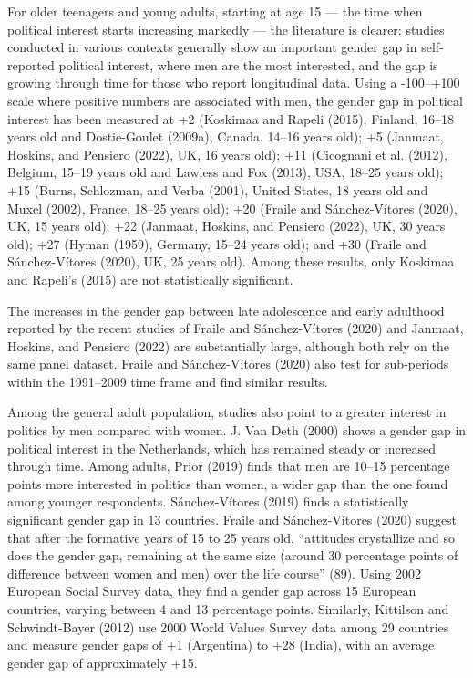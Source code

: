 \documentclass[
  letterpaper,
  DIV=11,
  numbers=noendperiod]{scrreprt}
\begin{document}
For older teenagers and young adults, starting at age 15 --- the time
when political interest starts increasing markedly --- the literature is
clearer: studies conducted in various contexts generally show an
important gender gap in self-reported political interest, where men are
the most interested, and the gap is growing through time for those who
report longitudinal data. Using a -100--+100 scale where positive
numbers are associated with men, the gender gap in political interest
has been measured at +2 (Koskimaa and Rapeli (2015), Finland, 16--18
years old and Dostie-Goulet (2009a), Canada, 14--16 years old); +5
(Janmaat, Hoskins, and Pensiero (2022), UK, 16 years old); +11
(Cicognani et al. (2012), Belgium, 15--19 years old and Lawless and Fox
(2013), USA, 18--25 years old); +15 (Burns, Schlozman, and Verba (2001),
United States, 18 years old and Muxel (2002), France, 18--25 years old);
+20 (Fraile and Sánchez-Vítores (2020), UK, 15 years old); +22 (Janmaat,
Hoskins, and Pensiero (2022), UK, 30 years old); +27 (Hyman (1959),
Germany, 15--24 years old); and +30 (Fraile and Sánchez-Vítores (2020),
UK, 25 years old). Among these results, only Koskimaa and Rapeli's
(2015) are not statistically significant.

The increases in the gender gap between late adolescence and early
adulthood reported by the recent studies of Fraile and Sánchez-Vítores
(2020) and Janmaat, Hoskins, and Pensiero (2022) are substantially
large, although both rely on the same panel dataset. Fraile and
Sánchez-Vítores (2020) also test for sub-periods within the 1991--2009
time frame and find similar results.

Among the general adult population, studies also point to a greater
interest in politics by men compared with women. J. Van Deth (2000)
shows a gender gap in political interest in the Netherlands, which has
remained steady or increased through time. Among adults, Prior (2019)
finds that men are 10--15 percentage points more interested in politics
than women, a wider gap than the one found among younger respondents.
Sánchez-Vítores (2019) finds a statistically significant gender gap in
13 countries. Fraile and Sánchez-Vítores (2020) suggest that after the
formative years of 15 to 25 years old, ``attitudes crystallize and so
does the gender gap, remaining at the same size (around 30 percentage
points of difference between women and men) over the life course'' (89).
Using 2002 European Social Survey data, they find a gender gap across 15
European countries, varying between 4 and 13 percentage points.
Similarly, Kittilson and Schwindt-Bayer (2012) use 2000 World Values
Survey data among 29 countries and measure gender gaps of +1 (Argentina)
to +28 (India), with an average gender gap of approximately +15.
\end{document}
